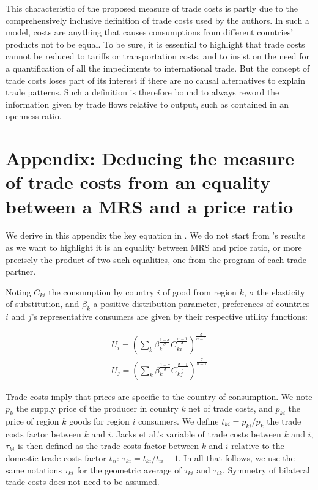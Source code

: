 \documentclass{article}
\begin{document}
This characteristic of the proposed measure of trade costs is
partly due to the comprehensively inclusive definition of trade
costs used by the authors. In such a model, costs are anything
that causes consumptions from different countries' products not
to be equal. To be sure, it is essential to highlight that
trade costs cannot be reduced to tariffs or transportation
costs, and to insist on the need for a quantification of all
the impediments to international trade. But the concept of
trade costs loses part of its interest if there are no causal
alternatives to explain trade patterns. Such a definition is
therefore bound to always reword the information given by trade
flows relative to output, such as contained in an openness
ratio.

\appendix

\section{\label{A1}Appendix: Deducing the measure of trade costs from an equality between a MRS and a price ratio}

We derive in this appendix the key equation in \cite{JMN2011}.
We do not start from \cite{AW2003}'s results as we want to
highlight it is an equality between MRS and price ratio, or
more precisely the product of two such equalities, one from the
program of each trade partner.

Noting $C_{ki}$ the consumption by country $i$ of good from
region $k$, $\sigma$ the elasticity of substitution, and
$\beta_k$ a positive distribution parameter, preferences of
countries $i$ and $j$'s representative consumers are given by
their respective utility functions:

\begin{eqnarray*}
U_i=\left(\sum_k\beta_{k}^{\frac{1-\sigma}{\sigma}}C_{ki}^{\frac{\sigma-1}{\sigma}}\right)^{\frac{\sigma}{\sigma-1}}\\
U_j=\left(\sum_k\beta_{k}^{\frac{1-\sigma}{\sigma}}C_{kj}^{\frac{\sigma-1}{\sigma}}\right)^{\frac{\sigma}{\sigma-1}}
\end{eqnarray*}

Trade costs imply that prices are specific to the country of
consumption. We note $p_k$ the supply price of the producer in
country $k$ net of trade costs, and $p_{ki}$ the price of
region $k$ goods for region $i$ consumers. We define
$t_{ki}=p_{ki}/p_{k}$ the trade costs factor between $k$ and
$i$. Jacks et al.'s variable of trade costs between $k$ and
$i$, $\tau_{ki}$ is then defined as the trade costs factor
between $k$ and $i$ relative to the domestic trade costs factor
$t_{ii}$: $\tau_{ki}=t_{ki}/t_{ii}-1$. In all that follows, we
use the same notations $\tau_{ki}$ for the geometric average of
$\tau_{ki}$ and $\tau_{ik}$. Symmetry of bilateral trade costs
does not need to be assumed.
\end{document}
